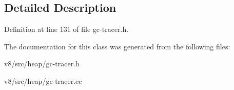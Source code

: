 \subsection{Detailed Description}


Definition at line 131 of file gc-\/tracer.\+h.



The documentation for this class was generated from the following files\+:\begin{DoxyCompactItemize}
\item 
v8/src/heap/gc-\/tracer.\+h\item 
v8/src/heap/gc-\/tracer.\+cc\end{DoxyCompactItemize}
